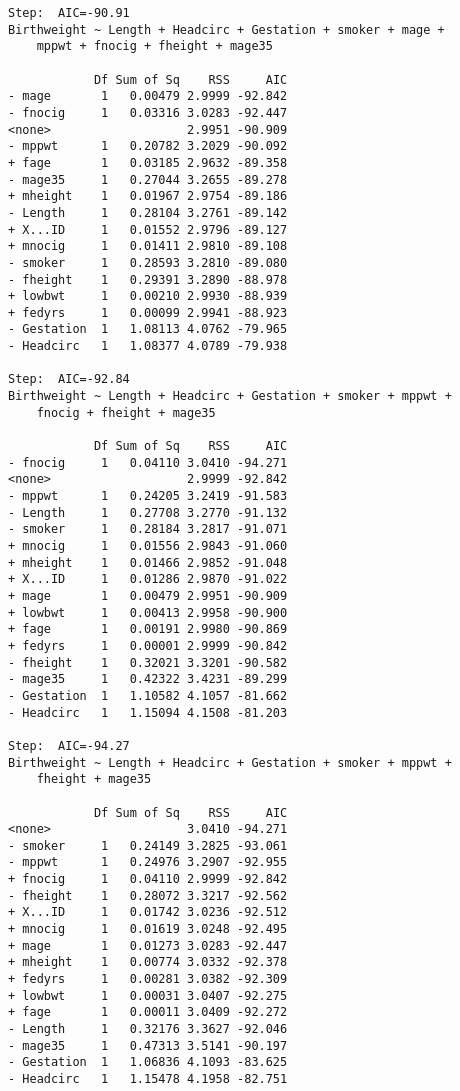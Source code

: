 \documentclass[11pt]{article}
\begin{document}
\begin{enumerate}
\begin{verbatim}
Step:  AIC=-90.91
Birthweight ~ Length + Headcirc + Gestation + smoker + mage + 
    mppwt + fnocig + fheight + mage35

            Df Sum of Sq    RSS     AIC
- mage       1   0.00479 2.9999 -92.842
- fnocig     1   0.03316 3.0283 -92.447
<none>                   2.9951 -90.909
- mppwt      1   0.20782 3.2029 -90.092
+ fage       1   0.03185 2.9632 -89.358
- mage35     1   0.27044 3.2655 -89.278
+ mheight    1   0.01967 2.9754 -89.186
- Length     1   0.28104 3.2761 -89.142
+ X...ID     1   0.01552 2.9796 -89.127
+ mnocig     1   0.01411 2.9810 -89.108
- smoker     1   0.28593 3.2810 -89.080
- fheight    1   0.29391 3.2890 -88.978
+ lowbwt     1   0.00210 2.9930 -88.939
+ fedyrs     1   0.00099 2.9941 -88.923
- Gestation  1   1.08113 4.0762 -79.965
- Headcirc   1   1.08377 4.0789 -79.938

Step:  AIC=-92.84
Birthweight ~ Length + Headcirc + Gestation + smoker + mppwt + 
    fnocig + fheight + mage35

            Df Sum of Sq    RSS     AIC
- fnocig     1   0.04110 3.0410 -94.271
<none>                   2.9999 -92.842
- mppwt      1   0.24205 3.2419 -91.583
- Length     1   0.27708 3.2770 -91.132
- smoker     1   0.28184 3.2817 -91.071
+ mnocig     1   0.01556 2.9843 -91.060
+ mheight    1   0.01466 2.9852 -91.048
+ X...ID     1   0.01286 2.9870 -91.022
+ mage       1   0.00479 2.9951 -90.909
+ lowbwt     1   0.00413 2.9958 -90.900
+ fage       1   0.00191 2.9980 -90.869
+ fedyrs     1   0.00001 2.9999 -90.842
- fheight    1   0.32021 3.3201 -90.582
- mage35     1   0.42322 3.4231 -89.299
- Gestation  1   1.10582 4.1057 -81.662
- Headcirc   1   1.15094 4.1508 -81.203

Step:  AIC=-94.27
Birthweight ~ Length + Headcirc + Gestation + smoker + mppwt + 
    fheight + mage35

            Df Sum of Sq    RSS     AIC
<none>                   3.0410 -94.271
- smoker     1   0.24149 3.2825 -93.061
- mppwt      1   0.24976 3.2907 -92.955
+ fnocig     1   0.04110 2.9999 -92.842
- fheight    1   0.28072 3.3217 -92.562
+ X...ID     1   0.01742 3.0236 -92.512
+ mnocig     1   0.01619 3.0248 -92.495
+ mage       1   0.01273 3.0283 -92.447
+ mheight    1   0.00774 3.0332 -92.378
+ fedyrs     1   0.00281 3.0382 -92.309
+ lowbwt     1   0.00031 3.0407 -92.275
+ fage       1   0.00011 3.0409 -92.272
- Length     1   0.32176 3.3627 -92.046
- mage35     1   0.47313 3.5141 -90.197
- Gestation  1   1.06836 4.1093 -83.625
- Headcirc   1   1.15478 4.1958 -82.751


\end{verbatim}
\end{enumerate}
\end{document}
